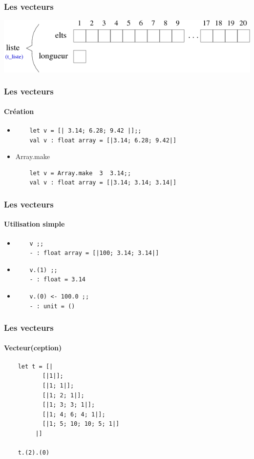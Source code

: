 \begin{frame}
	\frametitle{Les vecteurs}
	\includegraphics[scale=0.5]{pics/vect.png}
\end{frame}

\begin{frame}[fragile]
	\frametitle{Les vecteurs}
	\framesubtitle{Création}
	\begin{itemize}
	\item
	\begin{lstlisting}
	let v = [| 3.14; 6.28; 9.42 |];;
	val v : float array = [|3.14; 6.28; 9.42|]
	\end{lstlisting}

	\item Array.make
	\begin{lstlisting}
	let v = Array.make  3  3.14;;
	val v : float array = [|3.14; 3.14; 3.14|]
	\end{lstlisting}

	\end{itemize}
\end{frame}


\begin{frame}[fragile]
	\frametitle{Les vecteurs}
	\framesubtitle{Utilisation simple}
	\begin{itemize}
	\item
	\begin{lstlisting}
	v ;;
	- : float array = [|100; 3.14; 3.14|]
	\end{lstlisting}

	\item
	\begin{lstlisting}
	v.(1) ;;
	- : float = 3.14
	\end{lstlisting}

	\item
	\begin{lstlisting}
	v.(0) <- 100.0 ;;
	- : unit = ()
	\end{lstlisting}
	\end{itemize}
\end{frame}

\begin{frame}[fragile]
	\frametitle{Les vecteurs}
	\framesubtitle{Vecteur(ception)}
	\begin{lstlisting}
	let t = [| 
           [|1|];
           [|1; 1|];
           [|1; 2; 1|];
           [|1; 3; 3; 1|];
           [|1; 4; 6; 4; 1|];
           [|1; 5; 10; 10; 5; 1|]
         |] 
	
	t.(2).(0)
	\end{lstlisting}
\end{frame}

